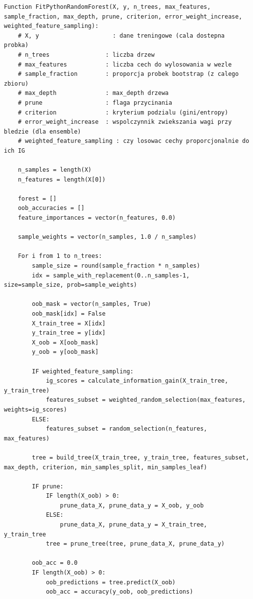 \documentclass[11pt,a4paper]{article}
\begin{document}
\begin{lstlisting}Function FitPythonRandomForest(X, y, n_trees, max_features, sample_fraction, max_depth, prune, criterion, error_weight_increase, weighted_feature_sampling):
    # X, y                     : dane treningowe (cala dostepna probka)
    # n_trees                : liczba drzew
    # max_features           : liczba cech do wylosowania w wezle
    # sample_fraction        : proporcja probek bootstrap (z calego zbioru)
    # max_depth              : max_depth drzewa
    # prune                  : flaga przycinania
    # criterion              : kryterium podzialu (gini/entropy)
    # error_weight_increase  : wspolczynnik zwiekszania wagi przy bledzie (dla ensemble)
    # weighted_feature_sampling : czy losowac cechy proporcjonalnie do ich IG

    n_samples = length(X)
    n_features = length(X[0])

    forest = []
    oob_accuracies = []
    feature_importances = vector(n_features, 0.0)

    sample_weights = vector(n_samples, 1.0 / n_samples)

    For i from 1 to n_trees:
        sample_size = round(sample_fraction * n_samples)
        idx = sample_with_replacement(0..n_samples-1, size=sample_size, prob=sample_weights)

        oob_mask = vector(n_samples, True)
        oob_mask[idx] = False
        X_train_tree = X[idx]
        y_train_tree = y[idx]
        X_oob = X[oob_mask]
        y_oob = y[oob_mask]

        IF weighted_feature_sampling:
            ig_scores = calculate_information_gain(X_train_tree, y_train_tree)
            features_subset = weighted_random_selection(max_features, weights=ig_scores)
        ELSE:
            features_subset = random_selection(n_features, max_features)

        tree = build_tree(X_train_tree, y_train_tree, features_subset, max_depth, criterion, min_samples_split, min_samples_leaf)

        IF prune:
            IF length(X_oob) > 0:
                prune_data_X, prune_data_y = X_oob, y_oob
            ELSE:
                prune_data_X, prune_data_y = X_train_tree, y_train_tree
            tree = prune_tree(tree, prune_data_X, prune_data_y)

        oob_acc = 0.0
        IF length(X_oob) > 0:
            oob_predictions = tree.predict(X_oob)
            oob_acc = accuracy(y_oob, oob_predictions)


\end{lstlisting}
\end{document}
